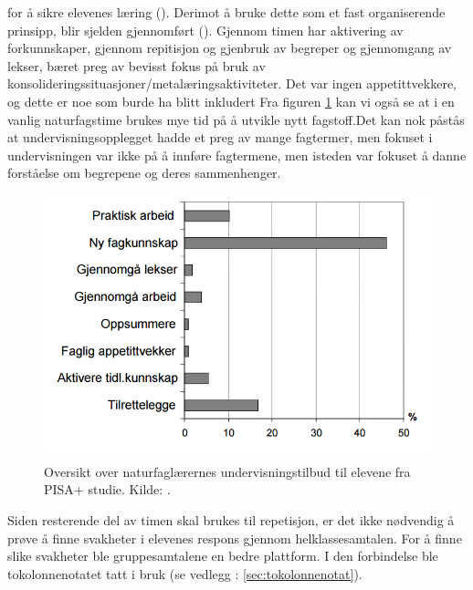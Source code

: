 \documentclass[main.tex]{subfiles}
\begin{document}
for å sikre elevenes læring (). Derimot å bruke dette som et fast
organiserende prinsipp, blir sjelden gjennomført (). Gjennom timen har 
aktivering av forkunnskaper, gjennom repitisjon og gjenbruk av begreper og gjennomgang av 
lekser, bæret preg av bevisst fokus på bruk av konsolideringssituasjoner/metalæringsaktiviteter.
Det var ingen appetittvekkere, og dette er noe som burde ha blitt inkludert 
\newline
\newline
Fra figuren \ref{fig:odeg10} kan vi også se at i en vanlig naturfagstime brukes mye tid på å utvikle 
nytt fagstoff.Det kan nok påstås at undervisningsopplegget hadde et preg av mange fagtermer, men 
fokuset i undervisningen var ikke på å innføre fagtermene, men isteden var fokuset å danne forståelse 
om begrepene og deres sammenhenger. 

\begin{figure}[h!]
\includegraphics[scale = 0.6]{../figures/undervisnings_aktivitet.png}
\caption{Oversikt over naturfaglærernes undervisningstilbud til elevene fra PISA+ studie. Kilde: \protect{}.}
\label{fig:odeg10}
\end{figure}




Siden resterende del av timen skal brukes til repetisjon, er det ikke nødvendig å 
prøve å finne svakheter i elevenes respons gjennom helklassesamtalen. For å finne slike svakheter 
ble gruppesamtalene en bedre plattform. I den forbindelse ble tokolonnenotatet tatt i bruk (se 
vedlegg : \ref{sec:tokolonnenotat}).
\end{document}
